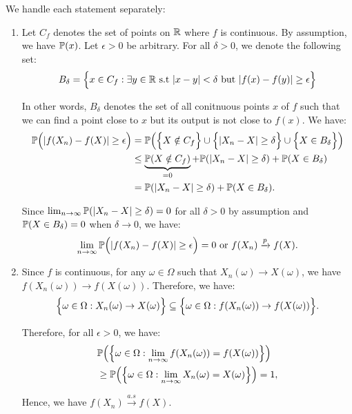 \begin{proof*}
    We handle each statement separately:

    \begin{enumerate}
        \item Let $C_f$ denotes the set of points on $\mathbb{R}$ where $f$ is continuous. By assumption, we have $\mathbb{P}(x)$. Let $\epsilon>0$ be arbitrary. For all $\delta>0$, we denote the following set:
        \begin{align*}
            B_\delta = \Big\{ 
                x\in C_f : \exists y\in\mathbb{R} \text{ s.t } |x-y| < \delta \text{ but } |f(x) - f(y)| \ge \epsilon
             \Big\}
        \end{align*} 

        \noindent In other words, $B_\delta$ denotes the set of all conitnuous points $x$ of $f$ such that we can find a point close to $x$ but its output is not close to $f(x)$. We have:
        \begin{align*}
            \mathbb{P}\Big( |f(X_n) - f(X)| \ge \epsilon \Big) &= \mathbb{P}\Big( 
                \Big\{ X \notin C_f \Big\} \cup \Big\{ |X_n - X| \ge \delta \Big\} \cup \Big\{ X \in B_\delta \Big\}
             \Big) \\ 
            &\le \underbrace{\mathbb{P}(X\notin C_f)}_{=0} + \mathbb{P}(|X_n - X| \ge \delta) + \mathbb{P}(X\in B_\delta) \\ 
            &= \mathbb{P}(|X_n - X| \ge \delta) + \mathbb{P}(X\in B_\delta).
        \end{align*} 

        \noindent Since $\lim_{n\to\infty}\mathbb{P}(|X_n - X| \ge \delta)=0$ for all $\delta>0$ by assumption and $\mathbb{P}(X\in B_\delta)=0$ when $\delta\to0$, we have:
        \begin{align*}
            \lim_{n\to\infty} \mathbb{P}\Big( |f(X_n) - f(X)| \ge \epsilon \Big) = 0 \text{ or } f(X_n) \xrightarrow{p} f(X).
        \end{align*} 

        \item Since $f$ is continuous, for any $\omega\in\Omega$ such that $X_n(\omega)\to X(\omega)$, we have $f(X_n(\omega))\to f(X(\omega))$. Therefore, we have:
        \begin{align*}
            \Big\{ \omega\in\Omega : X_n(\omega)\to X(\omega) \Big\}\subseteq\Big\{ \omega\in\Omega:f(X_n(\omega))\to f(X(\omega)) \Big\}.
        \end{align*}

        \noindent Therefore, for all $\epsilon>0$, we have:
        \begin{align*}
            &\mathbb{P}\Big( \Big\{ \omega\in\Omega:\lim_{n\to\infty} f(X_n(\omega)) = f(X(\omega)) \Big\} \Big) \\
            &\ge \mathbb{P}\Big( \Big\{ \omega\in\Omega:\lim_{n\to\infty} X_n(\omega) = X(\omega) \Big\} \Big) = 1,
        \end{align*}

        \noindent Hence, we have $f(X_n)\xrightarrow{a.s}f(X)$.
    \end{enumerate}
\end{proof*}
